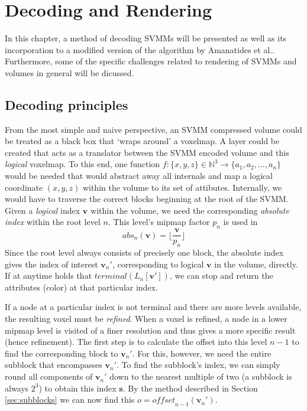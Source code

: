 \chapter{Decoding and Rendering} \label{ch:decoding}
%
In this chapter, a method of decoding SVMMs will be presented as well as its incorporation to a modified version of the algorithm by Amanatides et al.\cite{amanatides84}. Furthermore, some of the specific challenges related to rendering of SVMMs and volumes in general will be dicussed.
%
\section{Decoding principles} \label{sec:decoding}
%
From the most simple and naive perspective, an SVMM compressed volume could be treated as a black box that `wraps around' a voxelmap. A layer could be created that acts as a translator between the SVMM encoded volume and this \emph{logical} voxelmap. To this end, one function $ f \colon \{x,y,z\} \in \mathbb{N}^{3} \to \{a_1, a_2, \dotsc, a_n\} $ would be needed that would abstract away all internals and map a logical coordinate $(x,y,z)$ within the volume to its set of attibutes. Internally, we would have to traverse the correct blocks beginning at the root of the SVMM. Given a \emph{logical} index $\mathbf{v}$ within the volume, we need the corresponding \emph{absolute index} within the root level $n$. This level's mipmap factor $p_n$ is used in
$$ \textit{abs}_n(\mathbf{v}) = \lfloor \frac{\mathbf{v}}{p_n} \rfloor $$
Since the root level always consists of precisely one block, the absolute index gives the index of interest $\mathbf{v}_n'$, corresponding to logical $\mathbf{v}$ in the volume, directly. If at anytime holds that $\textit{terminal}(L_n[\mathbf{v}'])$, we can stop and return the attributes (color) at that particular index.

If a node at a particular index is not terminal and there are more levels available, the resulting voxel must be \emph{refined}. When a voxel is refined, a node in a lower mipmap level is visited of a finer resolution and thus gives a more specific result (hence refinement). The first step is to calculate the offset into this level $n-1$ to find the corresponding block to $\mathbf{v}_n'$. For this, however, we need the entire subblock that encompasses $\mathbf{v}_n'$. To find the subblock's index, we can simply round all components of $\mathbf{v}_n'$ down to the nearest multiple of two (a subblock is always $2^3$) to obtain this index $\mathbf{s}$. By the method described in Section \ref{sec:subblocks} we can now find this $o = \textit{offset}_{n-1}(\mathbf{v}_n')$.

